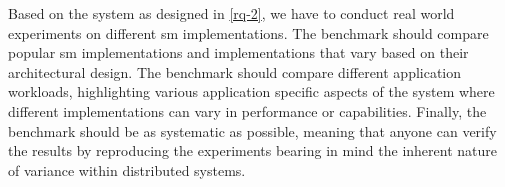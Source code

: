 \begin{enumerate}[label=\textbf{RQ\arabic*}, leftmargin=3\parindent]
    Based on the system as designed in \ref{rq-2}, we have to conduct real world experiments on different \gls{sm} implementations. The benchmark should compare popular \gls{sm} implementations and implementations that vary based on their architectural design. The benchmark should compare different application workloads, highlighting various application specific aspects of the system where different implementations can vary in performance or capabilities. Finally, the benchmark should be as systematic as possible, meaning that anyone can verify the results by reproducing the experiments bearing in mind the inherent nature of variance within distributed systems.

\end{enumerate}



